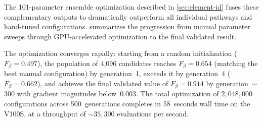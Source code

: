 The 101-parameter ensemble optimization described in \cref{sec:element-id} fuses these complementary outputs to dramatically outperform all individual pathways and hand-tuned configurations.
 summarizes the progression from manual parameter sweeps through GPU-accelerated optimization to the final validated result.

\begin{table}[t]
  \centering
  \caption{Comparison of element identification optimization approaches on 74~Aalto spectra. The GPU-accelerated 101-parameter ensemble achieves $F_{\beta=0.5} = 0.914$, a 121\% improvement over the hand-tuned baseline, evaluating $2 \times 10^6$ configurations in 58~seconds.}
  \label{tab:optimization-comparison}
\end{table}

The optimization converges rapidly: starting from a random initialization ($F_{\beta} = 0.497$), the population of 4{,}096 candidates reaches $F_{\beta} = 0.654$ (matching the best manual configuration) by generation~1, exceeds it by generation~4 ($F_{\beta} = 0.662$), and achieves the final validated value of $F_{\beta} = 0.914$ by generation~$\sim$300 with gradient magnitudes below~0.003.
The total optimization of $2{,}048{,}000$ configurations across 500~generations completes in 58~seconds wall time on the V100S, at a throughput of ${\sim}35{,}300$ evaluations per second.

